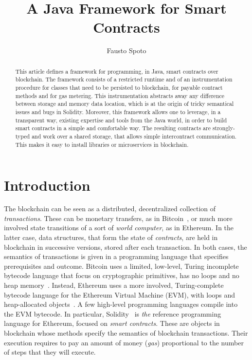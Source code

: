 \documentclass[10pt]{llncs}
\begin{document}
\title{
  A Java Framework for Smart Contracts}

\author{Fausto Spoto}


\maketitle

\begin{abstract}
  This article defines a framework for programming, in Java, smart contracts
  over blockchain.
  The framework consists of a restricted runtime and of an instrumentation
  procedure for classes that need to be persisted to blockchain,
  for payable contract methods and for gas metering.
  This instrumentation
  abstracts away any difference between storage and memory data location,
  which is at the origin of tricky semantical issues and bugs in Solidity.
  Moreover, this framework allows one to leverage, in a transparent way,
  existing expertise and tools from the Java world, in order to build
  smart contracts in a simple and comfortable way. The resulting contracts
  are strongly-typed and work over a shared storage, that allows simple
  intercontract communication.
  This makes it easy to install libraries
  or microservices in blockchain.
\end{abstract}

\section{Introduction}\label{sec:introduction}

The blockchain can be seen as a distributed, decentralized
collection of \emph{transactions}. These can be
monetary transfers, as in Bitcoin~\cite{Nakamoto08}, or much more
involved state transitions
of a sort of \emph{world computer}, as in Ethereum.
In the latter case, data structures, that form the state of \emph{contracts},
are held in blockchain in successive versions,
stored after each transaction. In both cases, the semantics of transactions is
given in a programming language that specifies prerequisites
and outcome. Bitcoin uses a limited, low-level,
Turing incomplete bytecode language that focus
on cryptographic primitives, has no loops and
no heap memory~\cite{Antonopoulos17}.
Instead, Ethereum uses a more involved,
Turing-complete bytecode language for the Ethereum Virtual Machine (EVM),
with loops and heap-allocated objects~\cite{AntonopoulosW18}. A few high-level
programming languages compile into the EVM bytecode. In particular,
Solidity~\cite{solidity}
is \emph{the} reference programming language for Ethereum,
focused on \emph{smart contracts}. These are objects
in blockchain whose methods specify the semantics of blockchain transactions.
Their execution requires to pay an amount of money (\emph{gas})
proportional to the number of steps that they will execute.
\end{document}
